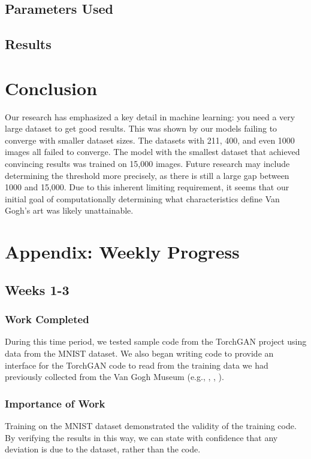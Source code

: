 \documentclass[12pt,letterpaper]{article}
\begin{document}
		\subsection{Parameters Used}

		\subsection{Results}

	\section{Conclusion}
		Our research has emphasized a key detail in machine learning: you need a very large dataset to get good results.
		This was shown by our models failing to converge with smaller dataset sizes.
		The datasets with 211, 400, and even 1000 images all failed to converge.
		The model with the smallest dataset that achieved convincing results was trained on 15,000 images.
		Future research may include determining the threshold more precisely, as there is still a large gap between 1000 and 15,000.
		Due to this inherent limiting requirement, it seems that our initial goal of computationally determining what characteristics define Van Gogh's art was likely unattainable.

\appendix
	\section{Appendix: Weekly Progress}
		\subsection{Weeks 1-3}
			\subsubsection{Work Completed}
				During this time period, we tested sample code from the TorchGAN\cite{pal2019torchgan} project using data from the MNIST\cite{lecun2010mnist} dataset.
				We also began writing code to provide an interface for the TorchGAN code to read from the training data we had previously collected from the Van Gogh Museum (e.g., \cite{001}, \cite{002}, \cite{003}).
			\subsubsection{Importance of Work}
				Training on the MNIST dataset demonstrated the validity of the training code.
				By verifying the results in this way, we can state with confidence that any deviation is due to the dataset, rather than the code.
\end{document}

